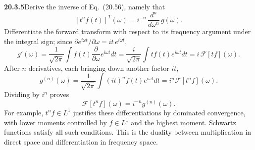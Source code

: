 \par\bigskip
\noindent\textbf{20.3.5}\quad Derive the inverse of Eq.~(20.56),
namely that
\[
\left[t^{n}f(t)\right]^{T}\!\!(\omega)
=i^{-n}\,\frac{d^{n}}{d\omega^{n}}\,g(\omega).
\]
\solution
Differentiate the forward transform with respect to
its frequency argument under the integral sign; since
$\partial e^{i\omega t}/\partial\omega=it\,e^{i\omega t}$,
\[
g'(\omega)=\frac1{\sqrt{2\pi}}\int f(t)
\frac\partial{\partial\omega}e^{i\omega t}dt
=\frac i{\sqrt{2\pi}}\int tf(t)e^{i\omega t}dt
=i\,\mathcal F[tf](\omega).
\]
After $n$ derivatives, each bringing down another factor $it$,
\[
g^{(n)}(\omega)=\frac1{\sqrt{2\pi}}\int (it)^nf(t)e^{i\omega t}dt
=i^n\mathcal F[t^nf](\omega).
\]
Dividing by $i^n$ proves
\[
\boxed{\mathcal F[t^nf](\omega)=i^{-n}g^{(n)}(\omega)}.
\]
For example, $t^nf\in L^1$ justifies these differentiations
by dominated convergence, with lower moments controlled by
$f\in L^1$ and the highest moment. Schwartz functions satisfy
all such conditions. This is the duality between multiplication
in direct space and differentiation in frequency space.

